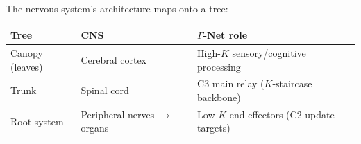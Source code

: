 \documentclass[aps,pre,twocolumn,superscriptaddress,floatfix]{revtex4-2}
\begin{document}
\begin{remark}
\label{rem:tree-topology}
The nervous system's architecture maps onto a tree:
\begin{center}
\begin{tabular}{lll}
\toprule
Tree & CNS & $\Gamma$-Net role \\
\midrule
Canopy (leaves) & Cerebral cortex &
  High-$K$ sensory/cognitive processing \\
Trunk & Spinal cord &
  C3 main relay ($K$-staircase backbone) \\
Root system & Peripheral nerves $\to$ organs &
  Low-$K$ end-effectors (C2 update targets) \\
\bottomrule
\end{tabular}
\end{center}


\end{remark}
\end{document}
